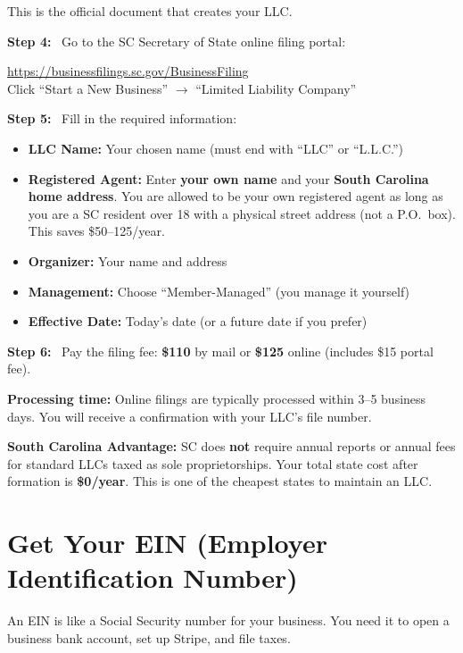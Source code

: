 \documentclass[12pt, letterpaper, oneside]{book}
\newcommand{\cost}[1]{\textcolor{money}{\textbf{#1}}}
\newcommand{\step}[1]{\noindent\textbf{\textcolor{primary}{Step #1:}}~}
\begin{document}
This is the official document that creates your LLC.

\step{4} Go to the SC Secretary of State online filing portal:
\begin{actionbox}
\url{https://businessfilings.sc.gov/BusinessFiling}\\[4pt]
Click ``Start a New Business'' $\rightarrow$ ``Limited Liability Company''
\end{actionbox}

\step{5} Fill in the required information:
\begin{itemize}[leftmargin=2em]
  \item \textbf{LLC Name:} Your chosen name (must end with ``LLC'' or ``L.L.C.'')
  \item \textbf{Registered Agent:} Enter \textbf{your own name} and your \textbf{South Carolina home address}. You are allowed to be your own registered agent as long as you are a SC resident over 18 with a physical street address (not a P.O.\ box). This saves \$50--125/year.
  \item \textbf{Organizer:} Your name and address
  \item \textbf{Management:} Choose ``Member-Managed'' (you manage it yourself)
  \item \textbf{Effective Date:} Today's date (or a future date if you prefer)
\end{itemize}

\step{6} Pay the filing fee: \cost{\$110} by mail or \cost{\$125} online (includes \$15 portal fee).

\begin{infobox}
\textbf{Processing time:} Online filings are typically processed within 3--5 business days. You will receive a confirmation with your LLC's file number.
\end{infobox}

\begin{costbox}
\textbf{South Carolina Advantage:} SC does \textbf{not} require annual reports or annual fees for standard LLCs taxed as sole proprietorships. Your total state cost after formation is \textbf{\$0/year}. This is one of the cheapest states to maintain an LLC.
\end{costbox}

\section{Get Your EIN (Employer Identification Number)}

An EIN is like a Social Security number for your business. You need it to open a business bank account, set up Stripe, and file taxes.
\end{document}
